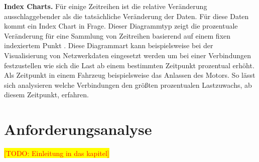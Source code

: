 \documentclass[draft=false
              ,paper=a4
              ,twoside=false
              ,fontsize=11pt
              ,headsepline
              ,BCOR10mm
              ,DIV11
              ]{scrbook}
\newcommand{\TODO}[1]{\colorbox{yellow}{\textcolor{red}{[TODO: #1]}}}
\begin{document}
\textbf{Index Charts.} Für einige Zeitreihen ist die relative Veränderung ausschlaggebender als die tatsächliche Veränderung der Daten. Für diese Daten kommt ein Index Chart in Frage. Dieser Diagrammtyp zeigt die prozentuale Veränderung für eine Sammlung von Zeitreihen basierend auf einem fixen indexiertem Punkt \cite{heer_tour_2010}. Diese Diagrammart kann beispielsweise bei der Visualisierung von Netzwerkdaten eingesetzt werden um bei einer Verbindungen festzustellen wie sich die Last ab einem bestimmten Zeitpunkt prozentual erhöht. Als Zeitpunkt in einem Fahrzeug beispielsweise das Anlassen des Motors. So lässt sich analysieren welche Verbindungen den größten prozentualen Lastzuwachs, ab diesem Zeitpunkt, erfahren.

%

\chapter{Anforderungsanalyse} %
\label{cha:anforderungsanalyse}
\TODO{Einleitung in das kapitel}
\end{document}
